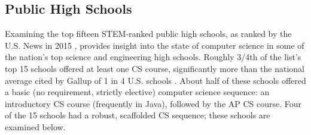 \subsection{Public High Schools}
Examining the top fifteen STEM-ranked public high schools, as ranked by the U.S. News in 2015 \cite{usnews}, provides insight into the state of computer science in some of the nation's top science and engineering high schools. Roughly 3/4th of the list's top 15 schools offered at least one CS course, significantly more than the national average cited by Gallup of 1 in 4 U.S. schools \cite{gallup}. About half of these schools offered a basic (no requirement, strictly elective) computer science sequence: an introductory CS course (frequently in Java), followed by the AP CS course. Four of the 15 schools had a robust, scaffolded CS sequence; these schools are examined below. \par


